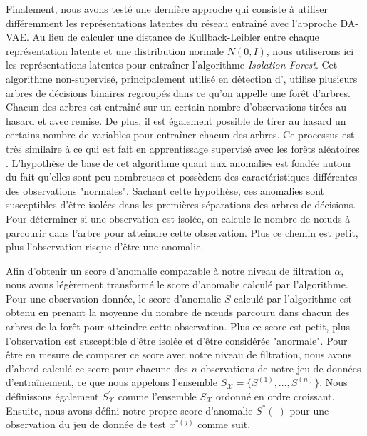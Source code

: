 Finalement, nous avons testé une dernière approche qui consiste à utiliser différemment les représentations latentes du réseau entraîné avec l'approche DA-VAE. Au lieu de calculer une distance de Kullback-Leibler entre chaque représentation latente et une distribution normale $N(0,I)$, nous utiliserons ici les représentations latentes pour entraîner l'algorithme \textit{Isolation Forest}. Cet algorithme non-supervisé, principalement utilisé en détection d'\DIFdelbegin {}\DIFdelend \DIFaddbegin {}\DIFaddend , utilise plusieurs arbres de décisions binaires regroupés dans ce qu'on appelle une forêt d'arbres. Chacun des arbres est entraîné sur un certain nombre d'observations tirées au hasard et avec remise. De plus, il est également possible de tirer au hasard un certains nombre de variables pour entraîner chacun des arbres. Ce processus est très similaire à ce qui est fait en apprentissage supervisé avec les forêts aléatoires \citep{Statistics01randomforests}. L'hypothèse de base de cet algorithme quant aux anomalies est fondée autour du fait qu'elles sont peu nombreuses et possèdent des caractéristiques différentes des observations "normales". Sachant cette hypothèse, ces anomalies sont susceptibles d'être isolées dans les premières séparations des arbres de décisions. Pour déterminer si une observation est isolée, on calcule le nombre de nœuds à parcourir dans l'arbre pour atteindre cette observation. Plus ce chemin est petit, plus l'observation risque d'être une anomalie.

Afin d'obtenir un score d'anomalie comparable à notre niveau de filtration $\alpha$, nous avons légèrement transformé le score d'anomalie calculé par l'algorithme. Pour une observation donnée, le score d'anomalie $S$  calculé par l'algorithme est obtenu en prenant la moyenne du nombre de nœuds parcouru dans chacun des arbres de la forêt pour atteindre cette observation. Plus ce score est petit, plus l'observation est susceptible d'être isolée et d'être considérée "anormale". Pour être en mesure de comparer ce score avec notre niveau de filtration, nous avons d'abord calculé ce score pour chacune des $n$ observations de notre jeu de données d'entraînement, ce que nous appelons l'ensemble $S_{\mathcal{X}} = \{S^{(1)}, ..., S^{(n)}\}$. Nous définissons également $S^{'}_{\mathcal{X}}$ comme l'ensemble $S_{\mathcal{X}}$ ordonné en ordre croissant.  Ensuite, nous avons défini notre propre score d'anomalie $S^*(\cdot)$ pour une observation du jeu de donnée de test $x^{*(j)}$ comme suit,

